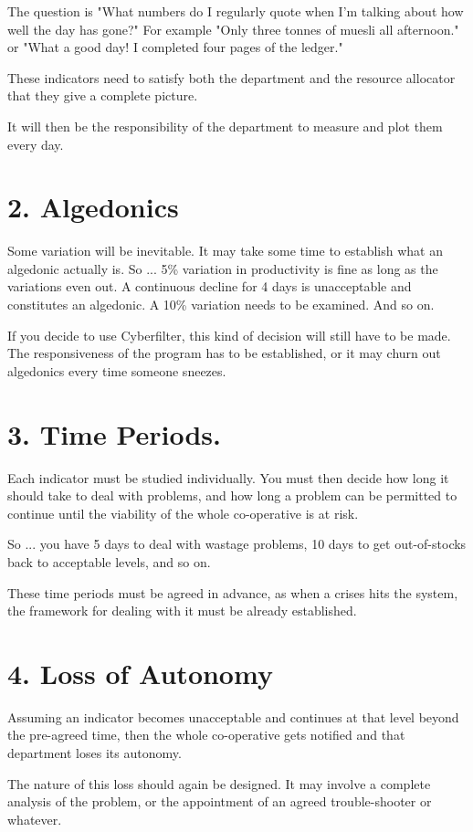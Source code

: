 The question is "What numbers do I regularly quote when I'm talking about how well the day has gone?" For example "Only three tonnes of muesli all afternoon." or "What a good day! I completed four pages of the ledger."

These indicators need to satisfy both the department and the resource allocator that they give a complete picture.

It will then be the responsibility of the department to measure and plot them every day.

\section*{2. Algedonics}
Some variation will be inevitable. It may take some time to establish what an algedonic actually is. So ... 5\% variation in productivity is fine as long as the variations even out. A continuous decline for 4 days is unacceptable and constitutes an algedonic. A 10\% variation needs to be examined. And so on.

If you decide to use Cyberfilter, this kind of decision will still have to be made. The responsiveness of the program has to be established, or it may churn out algedonics every time someone sneezes.

\section*{3. Time Periods.}
Each indicator must be studied individually. You must then decide how long it should take to deal with problems, and how long a problem can be permitted to continue until the viability of the whole co-operative is at risk.

So ... you have 5 days to deal with wastage problems, 10 days to get out-of-stocks back to acceptable levels, and so on.

These time periods must be agreed in advance, as when a crises hits the system, the framework for dealing with it must be already established.

\section*{4. Loss of Autonomy}
Assuming an indicator becomes unacceptable and continues at that level beyond the pre-agreed time, then the whole co-operative gets notified and that department loses its autonomy.

The nature of this loss should again be designed. It may involve a complete analysis of the problem, or the appointment of an agreed trouble-shooter or whatever.


